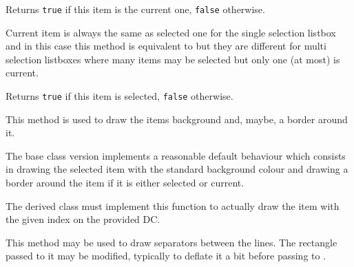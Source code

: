 Returns {\tt true} if this item is the current one, {\tt false} otherwise.

Current item is always the same as selected one for the single selection
listbox and in this case this method is equivalent to
 but they are different for multi
selection listboxes where many items may be selected but only one (at most) is
current.


\label{wxvlistboxisselected}


Returns {\tt true} if this item is selected, {\tt false} otherwise.


\label{wxvlistboxondrawbackground}


This method is used to draw the items background and, maybe, a border
around it.

The base class version implements a reasonable default behaviour which
consists in drawing the selected item with the standard background
colour and drawing a border around the item if it is either selected or
current.


\label{wxvlistboxondrawitem}


The derived class must implement this function to actually draw the item
with the given index on the provided DC.






\label{wxvlistboxondrawseparator}


This method may be used to draw separators between the lines. The rectangle
passed to it may be modified, typically to deflate it a bit before passing to
.

